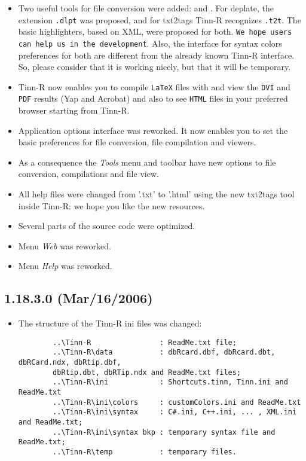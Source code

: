 \begin{itemize}
  \item Two useful tools for file conversion were added:
    and
    .
    For deplate, the extension \texttt{.dlpt} was proposed, and for txt2tags
    Tinn-R recognizes \texttt{.t2t}. The basic highlighters, based on XML,
    were proposed for both. \texttt{We hope users can help us in the
      development}. Also, the interface for syntax colors preferences for
    both are different from the already known Tinn-R interface. So, please
    consider that it is working nicely, but that it will be temporary.
  \item Tinn-R now enables you to compile \texttt{LaTeX} files with
     and view the
    \texttt{DVI} and \texttt{PDF} results (Yap and Acrobat) and also
    to see \texttt{HTML} files in your preferred browser starting from
    Tinn-R.
  \item Application options interface was reworked. It now enables you
    to set the basic preferences for file conversion, file compilation
    and viewers.
  \item As a consequence the \textit{Tools} menu and toolbar have new
    options to file conversion, compilations and file view.
  \item All help files were changed from '.txt' to '.html' using the
    new txt2tags tool inside Tinn-R: we hope you like the new resources.
  \item Several parts of the source code were optimized.
  \item Menu \textit{Web} was reworked.
  \item Menu \textit{Help} was reworked.
\end{itemize}


\subsection*{1.18.3.0 (Mar/16/2006)}
\begin{itemize}
  \item The structure of the Tinn-R ini files was changed:

    \begin{footnotesize}
      \begin{verbatim}
        ..\Tinn-R                : ReadMe.txt file;
        ..\Tinn-R\data           : dbRcard.dbf, dbRcard.dbt, dbRCard.ndx, dbRtip.dbf,
        dbRtip.dbt, dbRTip.ndx and ReadMe.txt files;
        ..\Tinn-R\ini            : Shortcuts.tinn, Tinn.ini and ReadMe.txt
        ..\Tinn-R\ini\colors     : customColors.ini and ReadMe.txt
        ..\Tinn-R\ini\syntax     : C#.ini, C++.ini, ... , XML.ini and ReadMe.txt;
        ..\Tinn-R\ini\syntax bkp : temporary syntax file and ReadMe.txt;
        ..\Tinn-R\temp           : temporary files.
      \end{verbatim}
    \end{footnotesize}

\end{itemize}


